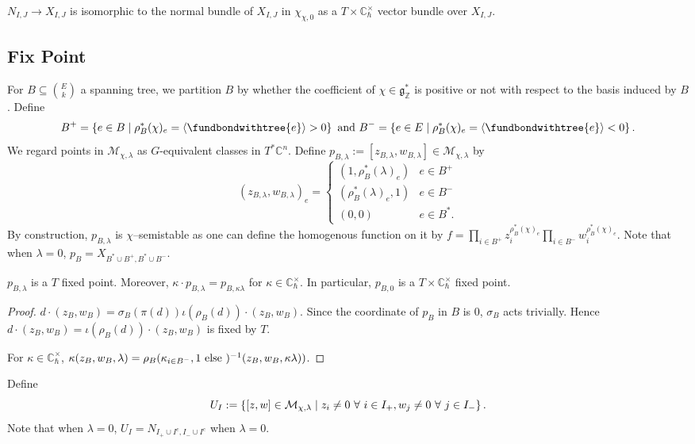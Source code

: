 \documentclass[b5paper]{article}
\newcommand{\MM}{\mathcal{M}}
\newcommand{\Chbar}{\mathbb{C}^\times _\hbar}
\begin{document}
\begin{theorem}[thm:]{}
  $N_{I,J}\rightarrow X_{I,J}$ is isomorphic to the normal bundle of $X_{I,J}$ in $\chi_{\chi,0}$ as a $T\times \Chbar$ vector bundle over $X_{I,J}$.
\end{theorem}

\subsection{Fix Point}

For $B\subseteq \binom{E}{k}$ a spanning tree, we partition $B$ by whether the coefficient of $\chi\in \mathfrak{g}_\mathbb{Z}^*$ is positive or not with respect to the basis induced by $B$. Define 
\[
    B^+=\CB{e\in B\mid \rho^*_B(\chi)_e=\AB{\fundbondwithtree{e}}>0}
\textnormal{ and }
B^-=\CB{e\in E\mid \rho^*_B(\chi)_e=\AB{\fundbondwithtree{e}}<0}.
\]
We regard points in $\MM_{\chi,\lambda}$ as $G$-equivalent classes in $T^*\mathbb{C}^n$. 
Define $p_{B,\lambda}:=[z_{B,\lambda},w_{B,\lambda}]\in \MM_{\chi,\lambda}$ by 
\[
    (z_{B,\lambda},w_{B,\lambda})_e=\begin{cases}
    (1,\rho_B^*(\lambda)_e) & e\in B^+\\
    (\rho_B^*(\lambda)_e,1) & e\in B^-\\
    (0,0) & e\in B^*.
  \end{cases}
\]
By construction, $p_{B,\lambda}$ is $\chi$--semistable as one can define the homogenous function on it by $f=\prod_{i\in B^+}^{}z_i^{\rho_B^*(\chi)_e}\prod_{i\in B^-}^{}w_i^{\rho_B^*(\chi)_e}$.
Note that when $\lambda=0$, $p_B=X_{B^*\cup B^+,B^*\cup B^-}$.

\begin{proposition}[pps:]{}
  $p_{B,\lambda}$ is a $T$ fixed point.
  Moreover, $\kappa\cdot p_{B,\lambda}=p_{B,\kappa\lambda}$ for $\kappa\in \Chbar$. In particular, $p_{B,0}$ is a $T\times \Chbar$ fixed point.
  \begin{proof}
    $d\cdot (z_B,w_B)=\sigma_B(\pi(d))\iota(\rho_B(d))\cdot (z_B,w_B)$. Since the coordinate of $p_B$ in $B$ is $0$, $\sigma_B$ acts trivially. Hence $d\cdot (z_B,w_B)=\iota(\rho_B(d))\cdot (z_B,w_B)$ is fixed by $T$.

    For $\kappa\in \Chbar$, $\kappa(z_B,w_B,\lambda)=\rho_B(\kappa_{i\in B^-},1\textnormal{ else })^{-1}(z_B,w_B,\kappa\lambda))$.
  \end{proof}
\end{proposition}

Define 
\[
U_I:=\CB{[z,w]\in \MM_{\chi,\lambda}\mid z_i\neq 0\ \forall\ i\in I_+, w_j\neq 0\ \forall\ j\in I_-}.
\]
Note that when $\lambda=0$, $U_I=N_{I_+\cup I^c,I_-\cup I^c}$ when $\lambda=0$.
\end{document}

